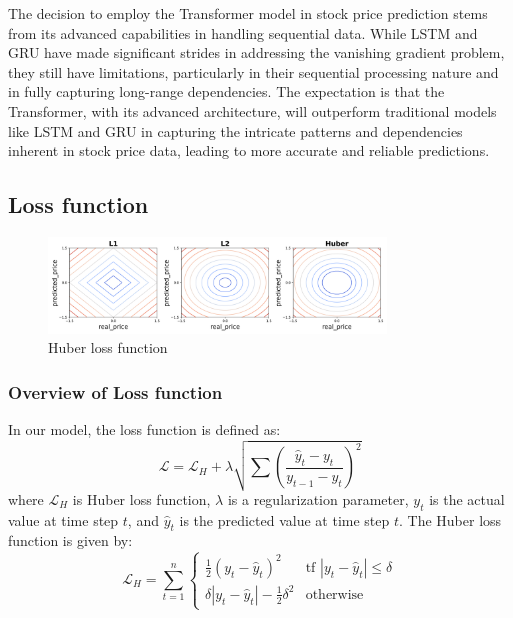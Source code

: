 The decision to employ the Transformer model in stock price prediction stems from its advanced capabilities in handling sequential data. 
While LSTM and GRU have made significant strides in addressing the vanishing gradient problem, they still have limitations, particularly in their sequential processing nature and in fully capturing long-range dependencies.
The expectation is that the Transformer, with its advanced architecture, will outperform traditional models like LSTM and GRU in capturing the intricate patterns and dependencies inherent in stock price data, leading to more accurate and reliable predictions.

\subsection{Loss function}
\begin{figure}
	\centering
	\includegraphics[width=0.8\textwidth]{Fig/loss_function.png}
	\caption{Huber loss function}
	\label{fig:huber_loss}
\end{figure}

\subsubsection{Overview of Loss function}
In our model, the loss function is defined as:
\begin{equation}
	\mathcal{L} = \mathcal{L}_{H} + \lambda \sqrt{\sum \left( \frac{\hat{y}_{t} - {y}_{t}}{{y}_{t-1} - {y}_{t}} \right)^{2}}
\end{equation}
where $\mathcal{L}_{H}$ is Huber loss function, $\lambda$ is a regularization parameter, $y_{t}$ is the actual value at time step $t$, and $\hat{y}_{t}$ is the predicted value at time step $t$.
The Huber loss function is given by:
\begin{equation}
	\label{eq:huber_loss}
	\mathcal{L}_{H} = \sum_{t=1}^{n} \begin{cases}
		\frac{1}{2}(y_{t} - \hat{y}_{t})^{2} & \text{tf } |y_{t} - \hat{y}_{t}| \leq \delta \\
		\delta |y_{t} - \hat{y}_{t}| - \frac{1}{2}\delta^{2} & \text{otherwise}
	\end{cases}
\end{equation}

